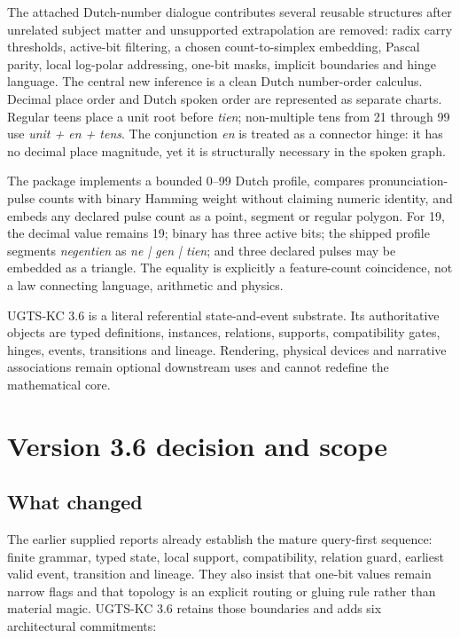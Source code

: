 \documentclass[10pt,a4paper]{article}
\newcommand{\code}[1]{\texttt{\detokenize{#1}}}
\begin{document}
The attached Dutch-number dialogue contributes several reusable structures after unrelated subject matter and unsupported extrapolation are removed: radix carry thresholds, active-bit filtering, a chosen count-to-simplex embedding, Pascal parity, local log-polar addressing, one-bit masks, implicit boundaries and hinge language. The central new inference is a clean Dutch number-order calculus. Decimal place order and Dutch spoken order are represented as separate charts. Regular teens place a unit root before \emph{tien}; non-multiple tens from 21 through 99 use \emph{unit + en + tens}. The conjunction \emph{en} is treated as a connector hinge: it has no decimal place magnitude, yet it is structurally necessary in the spoken graph.

The package implements a bounded 0--99 Dutch profile, compares pronunciation-pulse counts with binary Hamming weight without claiming numeric identity, and embeds any declared pulse count as a point, segment or regular polygon. For 19, the decimal value remains 19; binary \code{10011} has three active bits; the shipped profile segments \emph{negentien} as \emph{ne | gen | tien}; and three declared pulses may be embedded as a triangle. The equality is explicitly a feature-count coincidence, not a law connecting language, arithmetic and physics.

\begin{decisionbox}
UGTS-KC 3.6 is a literal referential state-and-event substrate. Its authoritative objects are typed definitions, instances, relations, supports, compatibility gates, hinges, events, transitions and lineage. Rendering, physical devices and narrative associations remain optional downstream uses and cannot redefine the mathematical core.
\end{decisionbox}

\tableofcontents
\clearpage
{}

\section{Version 3.6 decision and scope}

\subsection{What changed}
The earlier supplied reports already establish the mature query-first sequence: finite grammar, typed state, local support, compatibility, relation guard, earliest valid event, transition and lineage. They also insist that one-bit values remain narrow flags and that topology is an explicit routing or gluing rule rather than material magic. UGTS-KC 3.6 retains those boundaries and adds six architectural commitments:
\end{document}
